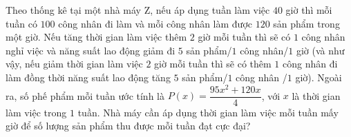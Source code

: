\begin{bt}%
	Theo thống kê tại một nhà máy Z, nếu áp dụng tuần làm việc $40$ giờ thì mỗi tuần có $100$ công nhân đi làm và mỗi công nhân làm được $120$ sản phẩm trong một giờ. Nếu tăng thời gian làm việc thêm $2$ giờ mỗi tuần thì sẽ có $1$ công nhân nghỉ việc và năng suất lao động giảm đi $5$ sản phẩm/$1$ công nhân/$1$ giờ (và như vậy, nếu giảm thời gian làm việc $2$ giờ mỗi tuần thì sẽ có thêm $1$ công nhân đi làm đồng thời năng suất lao động tăng $5$ sản phẩm/$1$ công nhân /$1$ giờ). Ngoài ra, số phế phẩm mỗi tuần ước tính là $P(x) = \dfrac{95x^2+120x}{4}$, với $x$ là thời gian làm việc trong $1$ tuần. Nhà máy cần áp dụng thời gian làm việc mỗi tuần mấy giờ để số lượng sản phẩm thu được mỗi tuần đạt cực đại?
\end{bt}

